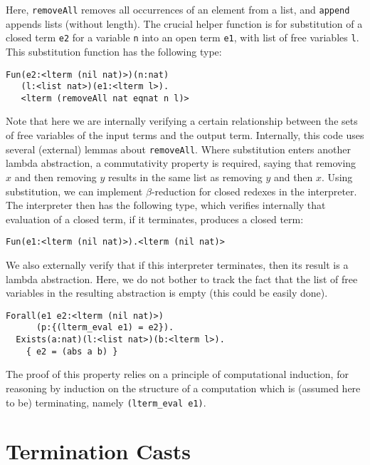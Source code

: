 \documentclass[preprint,natbib]{sigplanconf}
\begin{document}
\noindent Here, \texttt{removeAll} removes all occurrences of an
element from a list, and \texttt{append} appends lists (without
length).  The crucial helper function is for substitution of a closed
term \texttt{e2} for a variable \texttt{n} into an open term
\texttt{e1}, with list of free variables \texttt{l}.  This
substitution function has the following type:

\begin{verbatim}
Fun(e2:<lterm (nil nat)>)(n:nat)
   (l:<list nat>)(e1:<lterm l>).
   <lterm (removeAll nat eqnat n l)>
\end{verbatim}

\noindent Note that here we are internally verifying a certain
relationship between the sets of free variables of the input terms and
the output term.  Internally, this code uses several (external) lemmas
about \texttt{removeAll}.  Where substitution enters another lambda
abstraction, a commutativity property is required, saying that
removing $x$ and then removing $y$ results in the same list as
removing $y$ and then $x$.  Using substitution, we can implement
$\beta$-reduction for closed redexes in the interpreter.  The
interpreter then has the following type, which verifies internally
that evaluation of a closed term, if it terminates, produces a closed
term:

\begin{verbatim}
Fun(e1:<lterm (nil nat)>).<lterm (nil nat)> 
\end{verbatim}

We also externally verify that if this interpreter terminates, then
its result is a lambda abstraction.  Here, we do not bother to track
the fact that the list of free variables in the resulting abstraction
is empty (this could be easily done).

\begin{verbatim}
Forall(e1 e2:<lterm (nil nat)>)
      (p:{(lterm_eval e1) = e2}).
  Exists(a:nat)(l:<list nat>)(b:<lterm l>).
    { e2 = (abs a b) }
\end{verbatim}

\noindent The proof of this property relies on a principle of
computational induction, for reasoning by induction on the structure
of a computation which is (assumed here to be) terminating, namely
\texttt{(lterm\_eval e1)}.

\section{Termination Casts}
\label{sec:terminates}
\end{document}
